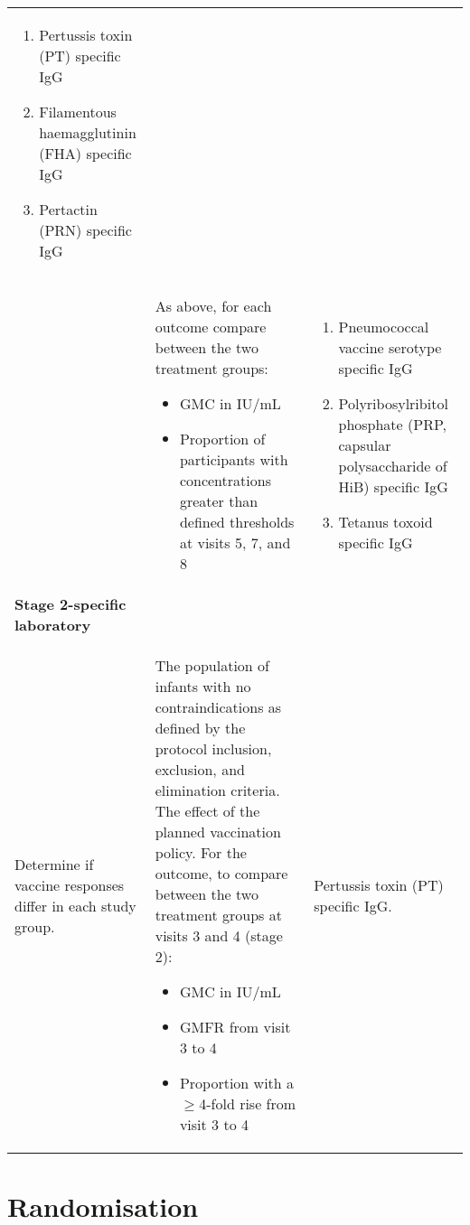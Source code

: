 \documentclass{bmcart}
\begin{document}
\begin{table}[h!]
\begin{tabular}{p{3cm}p{4.25cm}p{4.25cm}}
		\begin{enumerate}[leftmargin=*, labelsep=-0.1cm]
			\item Pertussis toxin (PT) specific IgG
			\item Filamentous haemagglutinin (FHA) specific IgG
			\item Pertactin (PRN) specific IgG
		\end{enumerate}
		\\
		& 		
		As above, for each outcome compare between the two treatment groups: 
		\begin{itemize}[leftmargin=0.5cm]
			\item GMC in IU/mL
			\item Proportion of participants with concentrations greater than defined thresholds at visits 5, 7, and 8
		\end{itemize} &
		\begin{enumerate}[leftmargin=*, labelsep=-0.1cm]
			\item Pneumococcal vaccine serotype specific IgG
			\item Polyribosylribitol phosphate (PRP, capsular polysaccharide of HiB) specific IgG
			\item Tetanus toxoid specific IgG
		\end{enumerate}
		\\
		\textbf{Stage 2-specific laboratory} & &  \\
		Determine if vaccine responses differ in each study group. &
		The population of infants with no contraindications as defined by the protocol inclusion, exclusion, and elimination criteria. \newline 
		The effect of the planned vaccination policy.\newline
		For the outcome, to compare between the two treatment groups at visits 3 and 4 (stage 2):
		\begin{itemize}[leftmargin=0.5cm]
			\item GMC in IU/mL
			\item GMFR from visit 3 to 4
			\item Proportion with a $\geq$4-fold rise from visit 3 to 4
		\end{itemize} &
		Pertussis toxin (PT) specific IgG.
		\\
		\hline
		\hline
	\end{tabular}
\end{table}


\section*{Randomisation}
\end{document}
